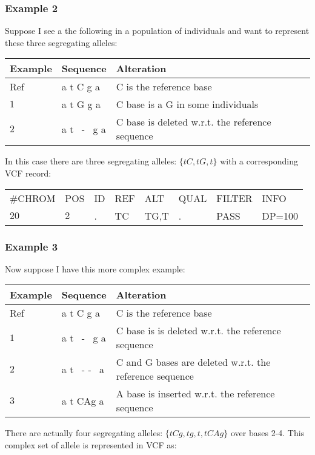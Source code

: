 \documentclass[8pt]{article}
\begin{document}
\subsubsection{Example 2}
Suppose I see a the following in a population of individuals and want to represent these three segregating alleles:

\vspace{0.3cm}
\begin{tabular}{ | l | l | l | }
\hline
Example & Sequence & Alteration \\ \hline
Ref & a t C g a & C is the reference base \\ \hline
$1$   & a t G g a & C base is a G in some individuals \\ \hline
$2$   & a t \ - \ g a & C base is deleted w.r.t. the reference sequence \\ \hline
\end{tabular}
\vspace{0.3cm}

In this case there are three segregating alleles: $\{tC,tG,t\}$ with a corresponding VCF record:

\vspace{0.3cm}
\begin{tabular}{ l l l l l l l l}
	\#CHROM & POS & ID & REF & ALT & QUAL & FILTER & INFO \\
	$20$ & $2$ & . & TC & TG,T & . & PASS & DP=100 \\
\end{tabular}
\subsubsection{Example 3}
Now suppose I have this more complex example:

\vspace{0.3cm}
\begin{tabular}{ | l | l | l | }
\hline
Example & Sequence & Alteration \\ \hline
Ref & a t C g a & C is the reference base \\ \hline
$1$   & a t \ - \ g a & C base is is deleted w.r.t. the reference sequence \\ \hline
$2$   & a t \ - - \ a & C and G bases are deleted w.r.t. the reference sequence\\ \hline
$3$   & a t CAg a & A base is inserted w.r.t. the reference sequence \\ \hline
\end{tabular}

\vspace{0.3cm}
There are actually four segregating alleles: $\{tCg,tg,t,tCAg\}$ over bases 2-4. This complex set of allele is represented in VCF as:
\end{document}
